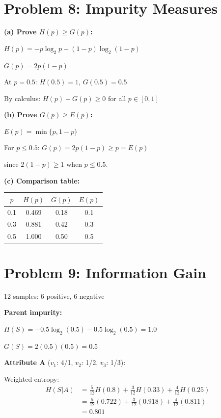 \documentclass[10pt,twocolumn]{article}
\begin{document}
\section*{Problem 8: Impurity Measures}

\textbf{(a) Prove \(H(p) \geq G(p)\):}

\(H(p) = -p\log_2 p - (1-p)\log_2(1-p)\)

\(G(p) = 2p(1-p)\)

At \(p=0.5\): \(H(0.5) = 1\), \(G(0.5) = 0.5\)

By calculus: \(H(p) - G(p) \geq 0\) for all \(p \in [0,1]\)

\textbf{(b) Prove \(G(p) \geq E(p)\):}

\(E(p) = \min\{p, 1-p\}\)

For \(p \leq 0.5\): \(G(p) = 2p(1-p) \geq p = E(p)\)

since \(2(1-p) \geq 1\) when \(p \leq 0.5\).

\textbf{(c) Comparison table:}

\begin{small}
\begin{tabular}{cccc}
\toprule
\(p\) & \(H(p)\) & \(G(p)\) & \(E(p)\) \\
\midrule
0.1 & 0.469 & 0.18 & 0.1 \\
0.3 & 0.881 & 0.42 & 0.3 \\
0.5 & 1.000 & 0.50 & 0.5 \\
\bottomrule
\end{tabular}
\end{small}

\section*{Problem 9: Information Gain}

12 samples: 6 positive, 6 negative

\textbf{Parent impurity:}

\(H(S) = -0.5\log_2(0.5) - 0.5\log_2(0.5) = 1.0\)

\(G(S) = 2(0.5)(0.5) = 0.5\)

\textbf{Attribute A} (\(v_1\): 4/1, \(v_2\): 1/2, \(v_3\): 1/3):

Weighted entropy:
\begin{align*}
H(S|A) &= \frac{5}{12}H(0.8) + \frac{3}{12}H(0.33) + \frac{4}{12}H(0.25) \\
&= \frac{5}{12}(0.722) + \frac{3}{12}(0.918) + \frac{4}{12}(0.811) \\
&= 0.801
\end{align*}
\end{document}
